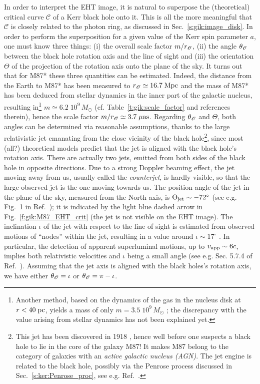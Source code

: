In order to interpret the EHT image, it is natural to superpose the (theoretical)
critical curve $\mathscr{C}$ of a Kerr black hole
onto it. This is all the more meaningful that $\mathscr{C}$ is closely related to
the photon ring, as discussed in Sec.~\ref{s:gik:image_disk}. In order to perform the
superposition for a given value of the Kerr spin parameter $a$, one must
know three things: (i) the overall scale factor $m/r_{\mathscr{O}}$, (ii) the angle $\theta_{\mathscr{O}}$ between the black hole rotation axis and the line of
sight and (iii) the orientation $\Theta$ of the projection of the rotation axis
onto the plane of the sky. It turns out that for M87* these three quantities can be estimated. Indeed, the distance from the Earth to M87* has been measured to
$r_{\mathscr{O}} \simeq 16.7 \; {\rm Mpc}$ and the mass of M87* has been deduced from stellar
dynamics in the inner part of the galactic nucleus, resulting in\footnote{Another method,
based on the dynamics of the gas in the nucleus disk at $r < 40 \; {\rm pc}$, yields
a mass of only $m = 3.5\; 10^9 \, M_\odot$ \cite{WalshBHS13}; the discrepancy
with the value arising from stellar dynamics has not been explained yet.}
$m\simeq 6.2\; 10^9 \, M_\odot$ (cf. Table~\ref{t:gik:scale_factor} and references therein), hence the scale factor $m/r_{\mathscr{O}} \simeq 3.7 \; \mu{\rm as}$. Regarding
$\theta_{\mathscr{O}}$ and $\Theta$, both angles can be determined via reasonable assumptions, thanks
to the large relativistic jet emanating from the close vicinity of the black hole\footnote{This jet has been discovered in 1918 \cite{Curtis1918}, hence
well before one suspects a black hole to lie
in the core of the galaxy M87! It makes M87 belong to the category of galaxies
with an \emph{active galactic nucleus (AGN)}. The jet engine
is related to the black hole, possibly via the Penrose process discussed in Sec.~\ref{s:ker:Penrose_proc}, see e.g. Ref.~\cite{AbramF13}.},
since most (all?) theoretical models predict that the jet is aligned with
the black hole's rotation axis. There are actually two jets, emitted from both
sides of the black hole in opposite directions. Due to a strong Doppler beaming effect,
the jet moving away from us, usually called the \emph{counterjet},
is hardly visible, so that the large observed jet is the one moving towards us.
The position angle of the jet in the plane of the sky, measured from the North axis,
is $\Theta_{\rm jet} \sim - 72^\circ$
(see e.g. Fig.~1 in Ref.~\cite{WalkeHDLJ18}); it is indicated by the light blue dashed
arrow in Fig.~\ref{f:gik:M87_EHT_crit} (the jet is not visible on the EHT image).
The inclination  $\iota$ of the jet with respect to the
line of sight is estimated from observed motions of ``nodes'' within the jet,
resulting in a value around $\iota \sim 17^\circ$
\cite{MerteLWH16,WalkeHDLJ18}. In particular, the detection of
apparent superluminal motions, up to $v_{\rm app} \sim 6 c$, implies
both relativistic velocities and $\iota$ being a small angle (see e.g. Sec. 5.7.4 of Ref.~\cite{Gourg13}).
Assuming that the jet axis is aligned with the black holes's rotation axis, we have either
$\theta_{\mathscr{O}} = \iota$ or $\theta_{\mathscr{O}} = \pi - \iota$.

